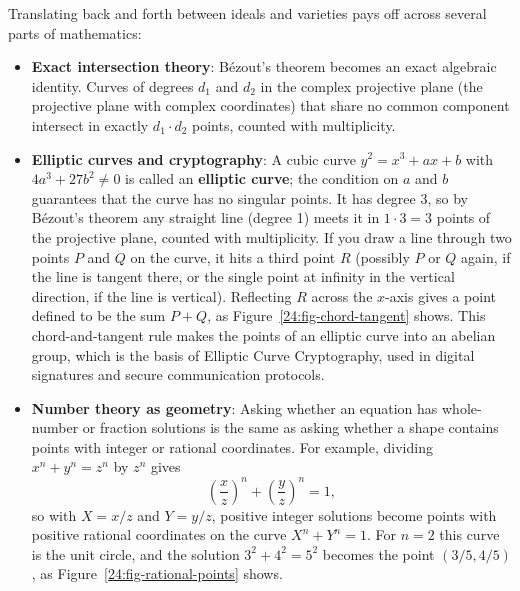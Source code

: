 Translating back and forth between ideals and varieties pays off across several parts of mathematics:
\begin{itemize}
\item \textbf{Exact intersection theory}: B\'ezout's theorem becomes an exact algebraic identity. Curves of degrees $d_1$ and $d_2$ in the complex projective plane (the projective plane with complex coordinates) that share no common component intersect in exactly $d_1 \cdot d_2$ points, counted with multiplicity.
\item \textbf{Elliptic curves and cryptography}: A cubic curve $y^2 = x^3 + ax + b$ with $4a^3 + 27b^2 \neq 0$ is called an \textbf{elliptic curve}; the condition on $a$ and $b$ guarantees that the curve has no singular points. It has degree 3, so by B\'ezout's theorem any straight line (degree 1) meets it in $1 \cdot 3 = 3$ points of the projective plane, counted with multiplicity. If you draw a line through two points $P$ and $Q$ on the curve, it hits a third point $R$ (possibly $P$ or $Q$ again, if the line is tangent there, or the single point at infinity in the vertical direction, if the line is vertical). Reflecting $R$ across the $x$-axis gives a point defined to be the sum $P + Q$, as Figure~\ref{24:fig-chord-tangent} shows. This chord-and-tangent rule makes the points of an elliptic curve into an abelian group, which is the basis of Elliptic Curve Cryptography, used in digital signatures and secure communication protocols.
\item \textbf{Number theory as geometry}: Asking whether an equation has whole-number or fraction solutions is the same as asking whether a shape contains points with integer or rational coordinates. For example, dividing $x^n + y^n = z^n$ by $z^n$ gives
\[
\left( \frac{x}{z} \right)^{\!n} + \left( \frac{y}{z} \right)^{\!n} = 1,
\]
so with $X = x/z$ and $Y = y/z$, positive integer solutions become points with positive rational coordinates on the curve $X^n + Y^n = 1$. For $n = 2$ this curve is the unit circle, and the solution $3^2 + 4^2 = 5^2$ becomes the point $(3/5, 4/5)$, as Figure~\ref{24:fig-rational-points} shows.
\end{itemize}

